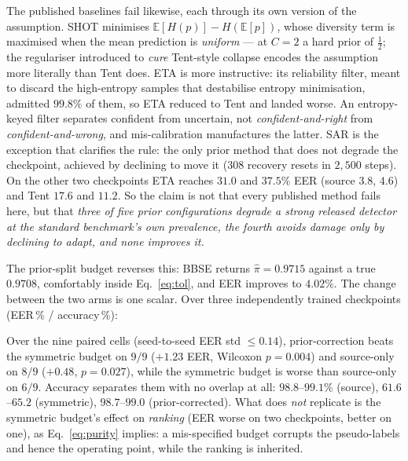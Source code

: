 \documentclass[conference]{IEEEtran}
\begin{document}
The published baselines fail likewise, each through its own version of the
assumption. SHOT minimises $\mathbb{E}[H(p)]-H(\mathbb{E}[p])$, whose diversity
term is maximised when the mean prediction is \emph{uniform} --- at $C{=}2$ a hard
prior of $\tfrac12$; the regulariser introduced to \emph{cure} Tent-style
collapse encodes the assumption more literally than Tent does. ETA is more
instructive: its reliability filter, meant to discard the high-entropy samples
that destabilise entropy minimisation, admitted $99.8\%$ of them, so ETA reduced
to Tent and landed worse. An entropy-keyed filter separates confident from
uncertain, not \emph{confident-and-right} from \emph{confident-and-wrong}, and
mis-calibration manufactures the latter. SAR is the exception that clarifies the
rule: the only prior method that does not degrade the checkpoint, achieved by
declining to move it ($308$ recovery resets in $2{,}500$ steps). On the other two checkpoints ETA reaches $31.0$ and $37.5\%$ EER (source $3.8$,
$4.6$) and Tent $17.6$ and $11.2$. So the claim is not that every published
method fails here, but that \emph{three of five prior configurations degrade a
strong released detector at the standard benchmark's own prevalence, the fourth
avoids damage only by declining to adapt, and none improves it.}

The prior-split budget reverses this: BBSE returns $\hat\pi{=}0.9715$ against a
true $0.9708$, comfortably inside Eq.~\eqref{eq:tol}, and EER improves to
$4.02\%$. The change between the two arms is one scalar. Over three
independently trained checkpoints (EER\,\% / accuracy\,\%):

\noindent Over the nine paired cells (seed-to-seed EER std $\le0.14$),
prior-correction beats
the symmetric budget on \textbf{$9/9$} ($+1.23$ EER, Wilcoxon $p{=}0.004$) and
source-only on $8/9$ ($+0.48$, $p{=}0.027$), while the symmetric budget is worse
than source-only on $6/9$. Accuracy separates them with no overlap at all:
$98.8$--$99.1\%$ (source), $61.6$--$65.2$ (symmetric), $98.7$--$99.0$
(prior-corrected). What does \emph{not} replicate is the symmetric budget's
effect on \emph{ranking} (EER worse on two checkpoints, better on one), as
Eq.~\eqref{eq:purity} implies: a mis-specified budget corrupts the pseudo-labels
and hence the operating point, while the ranking is inherited.
\end{document}
